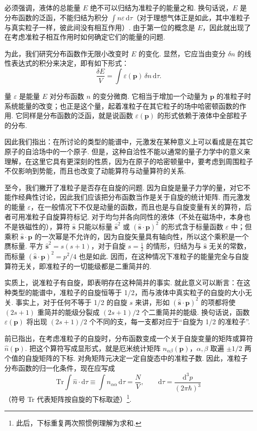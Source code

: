 必须强调，液体的总能量 $E$ 绝不可以归结为准粒子的能量之和. 换句话说，$E$ 是分布函数的泛函，不能归结为积分 $\int n\varepsilon\,\mathrm{d}\tau$（对于理想气体正是如此，其中准粒子与真实粒子一样，彼此间没有相互作用）. 由于第一位的概念是 $E$，因此就出现了在考虑准粒子相互作用时如何确定它们的能量的问题.

为此，我们研究分布函数作无限小改变时 $E$ 的变化. 显然，它应当由变分 $\delta n$ 的线性表达式的积分来决定，即有如下形式：
\begin{equation*}
\frac{\delta E}{V}=\int\varepsilon(\bm p)\,\delta n\,\mathrm{d}\tau.
\end{equation*}

量 $\varepsilon$ 是能量 $E$ 对分布函数 $n$ 的变分微商. 它相当于增加一个动量为 $\bm p$ 的准粒子时系统能量的改变；也正是这个量，起着准粒子在其它粒子的场中哈密顿函数的作用. 它同样是分布函数的泛函，就是说函数 $\varepsilon(\bm p)$ 的形式依赖于液体中全部粒子的分布.

因此我们指出：在所讨论的类型的能谱中，元激发在某种意义上可以看成是在其它原子的自洽场中的一个原子. 但是，这种自洽性不能以通常的量子力学中的意义来理解，在这里它具有更深刻的性质，因为在原子的哈密顿量中，要考虑到周围粒子不仅影响到势能，而且也改变了动能算符与动量算符的关系.

至今，我们撇开了准粒子是否存在自旋的问题. 因为自旋是量子力学的量，对它不能作经典性讨论，因此我们应该把分布函数当作是关于自旋的统计矩阵. 而元激发的能量 $\varepsilon$，在一般情况下不仅是动量的函数，而且也是与自旋变量有关的算符，后者可用准粒子自旋算符标记. 对于均匀并各向同性的液体（不处在磁场中，本身也不是铁磁性的），算符 $\hat{\bm s}$ 只能以标量 $\hat{\bm s}^{2}$ 或 $(\hat{\bm s}\cdot\bm p)^{2}$ 的形式含于标量函数 $\varepsilon$ 中；但乘积 $\hat{\bm s}\cdot\bm p$ 的一次幂是不允许的，因为自旋矢量具有轴向性，所以这个乘积是一个赝标量. 平方 $\hat{\bm s}^{2}=s(s+1)$，对于自旋 $s=\frac{1}{2}$ 的情形，归结为与 $\hat{\bm s}$ 无关的常数，而标量 $(\hat{\bm s}\cdot\bm p)^{2}=p^{2}/4$ 也是如此. 因而，在这种情况下准粒子的能量完全与自旋算符无关，即准粒子的一切能级都是二重简并的.

实质上，说准粒子有自旋，即表明存在这种简并的事实. 就此意义可以断言：在这种类型的能谱中，准粒子的自旋恒等于 1/2，而与液体中真实粒子的自旋的大小无关. 事实上，对于任何不等于 1/2 的自旋 $s$ 来讲，形如 $(\hat{\bm s}\cdot\bm p)^{2}$ 的项都将使 $(2s+1)$ 重简并的能级分裂成 $(2s+1)/2$ 个二重简并的能级. 换句话说，函数 $\varepsilon(\bm p)$ 将出现 $(2s+1)/2$ 个不同的支，每一支都对应于“自旋为 1/2 的准粒子”.

前已指出，在考虑准粒子的自旋时，分布函数变成一个关于自旋变量的矩阵或算符 $\hat n(\bm p)$. 把这个算符写成显形式，就是厄米统计矩阵 $n_{\alpha\beta}(\bm p)$，$\alpha,\beta$ 取遍 $\pm1/2$ 两个值的自旋矩阵的下标. 对角矩阵元决定一定自旋态中的准粒子数. 因此，准粒子分布函数的归一化条件，现在应写成
\begin{equation}
\mathrm{Tr}\int\hat n\cdot\mathrm{d}\tau\equiv\int n_{\alpha\alpha}\,\mathrm{d}\tau=\frac{N}{V},\qquad \mathrm{d}\tau=\frac{\mathrm{d}^{3}p}{(2\pi\hbar)^{3}}
\end{equation}
（符号 Tr 代表矩阵按自旋的下标取迹）\footnote{此后，下标重复两次照惯例理解为求和.}.

